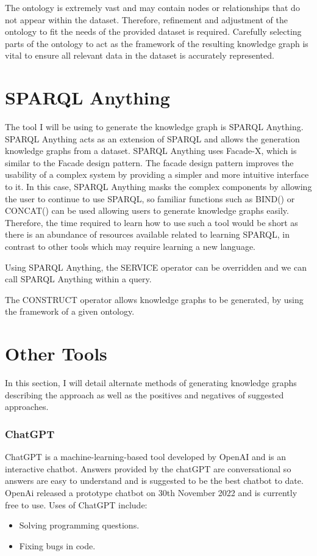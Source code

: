 The ontology is extremely vast and may contain nodes or relationships that do not appear within the dataset. Therefore, refinement and adjustment of the ontology to fit the needs of the provided dataset is required. Carefully selecting parts of the ontology to act as the framework of the resulting knowledge graph is vital to ensure all relevant data in the dataset is accurately represented. 

\section{SPARQL Anything}
\hspace{0.5cm} The tool I will be using to generate the knowledge graph is SPARQL Anything. SPARQL Anything acts as an extension of SPARQL and allows the generation knowledge graphs from a dataset. SPARQL Anything uses Facade-X, which is similar to the Facade design pattern. The facade design pattern improves the usability of a complex system by providing a simpler and more intuitive interface to it. In this case, SPARQL Anything masks the complex components by allowing the user to continue to use SPARQL, so familiar functions such as BIND() or CONCAT() can be used allowing users to generate knowledge graphs easily. Therefore, the time required to learn how to use such a tool would be short as there is an abundance of resources available related to learning SPARQL, in contrast to other tools which may require learning a new language. 

Using SPARQL Anything, the SERVICE operator can be overridden and we can call SPARQL Anything within a query. \cite{sparqlanything}

The CONSTRUCT operator allows knowledge graphs to be generated, by using the framework of a given ontology. \cite{sparqlanythinggithub}

\section{Other Tools}

\hspace{0.5cm} In this section, I will detail alternate methods of generating knowledge graphs describing the approach as well as the positives and negatives of suggested approaches.

\subsubsection{ChatGPT}
\hspace{0.5cm}  ChatGPT is a machine-learning-based tool developed by OpenAI and is an interactive chatbot. Answers provided by the chatGPT are conversational so answers are easy to understand and is suggested to be the best chatbot to date. \cite{chatgpt} OpenAi released a prototype chatbot on 30th November 2022 and is currently free to use. Uses of ChatGPT include:
\begin{itemize}
\item Solving programming questions.
\item Fixing bugs in code.
\end{itemize}

